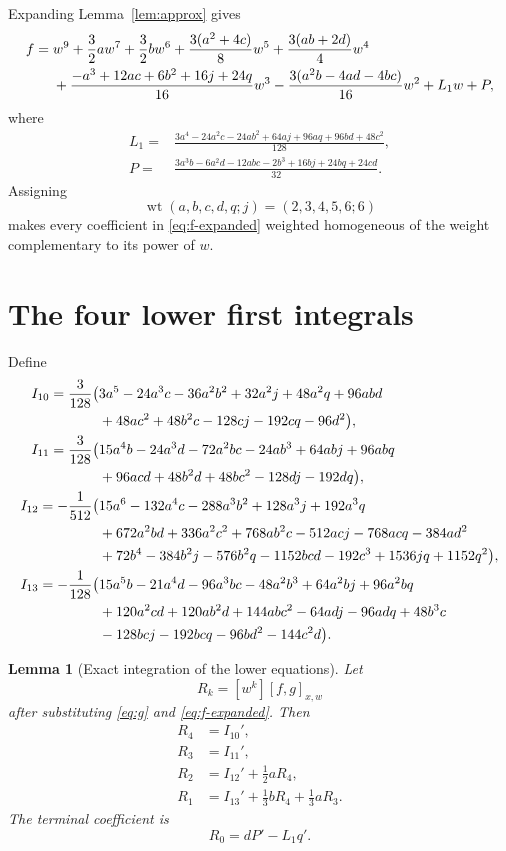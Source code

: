\documentclass[11pt]{article}
\newtheorem{lemma}[theorem]{Lemma}
\theoremstyle{definition}
\theoremstyle{remark}
\newcommand{\wt}{\operatorname{wt}}
\begin{document}
Expanding Lemma~\ref{lem:approx} gives
\begin{align}
 f={}&w^9+\frac32aw^7+\frac32bw^6
 +\frac{3(a^2+4c)}8w^5+\frac{3(ab+2d)}4w^4 \notag\\
 &+\frac{-a^3+12ac+6b^2+16j+24q}{16}w^3
 -\frac{3(a^2b-4ad-4bc)}{16}w^2+L_1w+P,
\label{eq:f-expanded}
\end{align}
where
\begin{align}
 L_1={}&\frac{
 3a^4-24a^2c-24ab^2+64aj+96aq+96bd+48c^2
 }{128},\label{eq:L}\\
 P={}&\frac{
 3a^3b-6a^2d-12abc-2b^3+16bj+24bq+24cd
 }{32}.
\label{eq:P}
\end{align}
Assigning
\[
 \wt(a,b,c,d,q;j)=(2,3,4,5,6;6)
\]
makes every coefficient in \eqref{eq:f-expanded} weighted homogeneous
of the weight complementary to its power of \(w\).

\section{The four lower first integrals}
\label{sec:integrals}

Define
\begin{align}
I_{10}={3\over128}\bigl(&3a^5-24a^3c-36a^2b^2+32a^2j+48a^2q
 +96abd \notag\\
 &+48ac^2+48b^2c-128cj-192cq-96d^2\bigr),
\label{eq:I10}\\
I_{11}={3\over128}\bigl(&15a^4b-24a^3d-72a^2bc-24ab^3
 +64abj+96abq \notag\\
 &+96acd+48b^2d+48bc^2-128dj-192dq\bigr),
\label{eq:I11}\\
I_{12}=-{1\over512}\bigl(&15a^6-132a^4c-288a^3b^2
 +128a^3j+192a^3q \notag\\
 &+672a^2bd+336a^2c^2+768ab^2c-512acj-768acq
 -384ad^2 \notag\\
 &+72b^4-384b^2j-576b^2q-1152bcd-192c^3
 +1536jq+1152q^2\bigr),
\label{eq:I12}\\
I_{13}=-{1\over128}\bigl(&15a^5b-21a^4d-96a^3bc-48a^2b^3
 +64a^2bj+96a^2bq \notag\\
 &+120a^2cd+120ab^2d+144abc^2-64adj-96adq
 +48b^3c \notag\\
 &-128bcj-192bcq-96bd^2-144c^2d\bigr).
\label{eq:I13}
\end{align}

\begin{lemma}[Exact integration of the lower equations]
\label{lem:integrals}
Let
\[
 R_k=[w^k][f,g]_{x,w}
\]
after substituting \eqref{eq:g} and \eqref{eq:f-expanded}.  Then
\[
\boxed{
\begin{aligned}
 R_4&=I_{10}',\\
 R_3&=I_{11}',\\
 R_2&=I_{12}'+\frac12aR_4,\\
 R_1&=I_{13}'+\frac13bR_4+\frac13aR_3.
\end{aligned}}
\]
The terminal coefficient is
\[
 R_0=dP'-L_1q'.
\]
\end{lemma}
\end{document}
